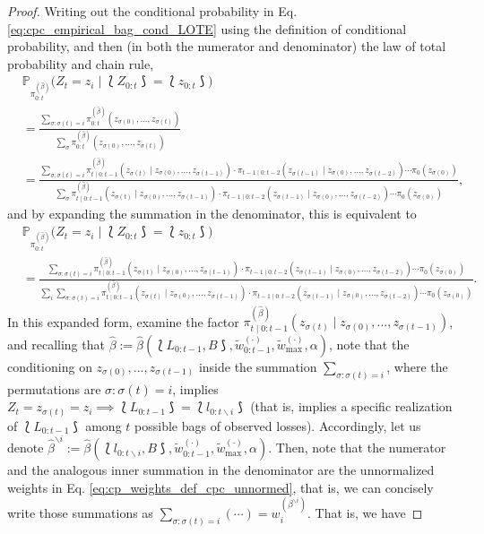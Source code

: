 \begin{proof}
Writing out the conditional probability in Eq. \eqref{eq:cpc_empirical_bag_cond_LOTE} using the definition of conditional probability, and then (in both the numerator and denominator) the law of total probability and chain rule,
\begin{align*}
    & \mathbb{P}_{\pi_{0:t}^{(\hat\beta)}}\big(Z_{t}=z_i \mid \lbag Z_{0:t} \rbag = \lbag z_{0:t} \rbag\big) \\
    & = \frac{\sum_{\sigma:\sigma(t)=i}\pi_{0:t}^{(\hat\beta)}(z_{\sigma(0)}, ..., z_{\sigma(t)})}{\sum_{\sigma}\pi_{0:t}^{(\hat\beta)}(z_{\sigma(0)}, ..., z_{\sigma(t)})} \\
    & = \frac{\sum_{\sigma:\sigma(t)=i}\pi_{t\mid 0:t-1}^{(\hat\beta)}(z_{\sigma(t)} \mid z_{\sigma(0)}, ..., z_{\sigma(t-1)})\cdot \pi_{t-1\mid 0:t-2}(z_{\sigma(t-1)} \mid z_{\sigma(0)}, ..., z_{\sigma(t-2)})\cdots \pi_{0}(z_{\sigma(0)})}{\sum_{\sigma}\pi_{t\mid 0:t-1}^{(\hat\beta)}(z_{\sigma(t)} \mid z_{\sigma(0)}, ..., z_{\sigma(t-1)})\cdot \pi_{t-1\mid 0:t-2}(z_{\sigma(t-1)} \mid z_{\sigma(0)}, ..., z_{\sigma(t-2)})\cdots \pi_{0}(z_{\sigma(0)})},
\end{align*}
and by expanding the summation in the denominator, this is equivalent to 
\begin{align*}
    & \mathbb{P}_{\pi_{0:t}^{(\hat\beta)}}\big(Z_{t}=z_i \mid \lbag Z_{0:t} \rbag = \lbag z_{0:t} \rbag\big) \\
    & = \frac{\sum_{\sigma:\sigma(t)=i}\pi_{t\mid 0:t-1}^{(\hat\beta)}(z_{\sigma(t)} \mid z_{\sigma(0)}, ..., z_{\sigma(t-1)})\cdot \pi_{t-1\mid 0:t-2}(z_{\sigma(t-1)} \mid z_{\sigma(0)}, ..., z_{\sigma(t-2)})\cdots \pi_{0}(z_{\sigma(0)})}{\sum_{i}\sum_{\sigma:\sigma(t)=i}\pi_{t\mid 0:t-1}^{(\hat\beta)}(z_{\sigma(t)} \mid z_{\sigma(0)}, ..., z_{\sigma(t-1)})\cdot \pi_{t-1\mid 0:t-2}(z_{\sigma(t-1)} \mid z_{\sigma(0)}, ..., z_{\sigma(t-2)})\cdots \pi_{0}(z_{\sigma(0)})}.
\end{align*}
In this expanded form, examine the factor $\pi_{t\mid 0:t-1}^{(\hat\beta)}(z_{\sigma(t)} \mid z_{\sigma(0)}, ..., z_{\sigma(t-1)})$, and recalling that $\hat\beta:= \hat{\beta}(\lbag L_{0:t-1}, B \rbag, \tilde{w}_{0:t-1}^{(\cdot)}, \tilde{w}_{\max}^{(\cdot)}, \alpha)$, note that the conditioning on $z_{\sigma(0)}, ..., z_{\sigma(t-1)}$ inside the summation $\sum_{\sigma:\sigma(t)=i}$, where the permutations are $\sigma:\sigma(t)=i$, implies  $Z_t=z_{\sigma(t)}=z_i \implies \lbag L_{0:t-1} \rbag = \lbag l_{0:t\backslash i} \rbag$ (that is, implies a specific realization of $\lbag L_{0:t-1} \rbag$ among $t$ possible bags of observed losses). Accordingly, let us denote $\hat\beta^{\backslash i}:= \hat{\beta}(\lbag l_{0:t\backslash i}, B \rbag, \tilde{w}_{0:t-1}^{(\cdot)}, \tilde{w}_{\max}^{(\cdot)}, \alpha)$. Then, note that the numerator and the analogous inner summation in the denominator are the unnormalized weights in Eq. \eqref{eq:cp_weights_def_cpc_unnormed}, that is, we can concisely write those summations as $\sum_{\sigma:\sigma(t)=i}(\cdots) = w_i^{(\beta^{\backslash i})}$. That is, we have

\end{proof}
